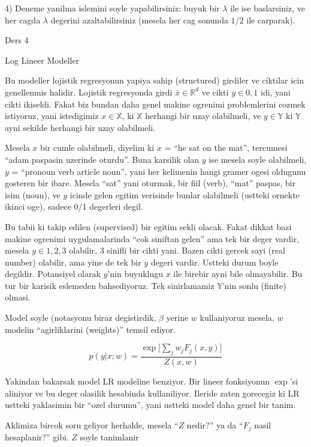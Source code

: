\documentclass[12pt,fleqn]{article}\usepackage{../common}
\begin{document}
4) Deneme yanilma islemini soyle yapabilirsiniz: buyuk bir $\lambda$ ile
ise baslarsiniz, ve her cagda $\lambda$ degerini azaltabilirsiniz (mesela
her cag sonunda $1/2$ ile carparak).

Ders 4

Log Lineer Modeller

Bu modeller lojistik regresyonun yapiya sahip (structured) girdiler ve
ciktilar icin genellenmis halidir. Lojistik regresyonda girdi $\bar{x} \in
\mathbb{R}^d$ ve 
cikti $y \in {0,1}$ idi, yani cikti ikiseldi. Fakat biz bundan daha genel makine
ogrenimi problemlerini cozmek istiyoruz, yani istedigimiz $x \in \mathbb{X}$, ki
$\mathbb{X}$ herhangi bir uzay olabilmeli, ve $y \in \mathbb{Y}$ ki $\mathbb{Y}$ ayni sekilde herhangi bir 
uzay olabilmeli. 

Mesela $x$ bir cumle olabilmeli, diyelim ki $x$ = ``he sat on the mat'',
tercumesi ``adam paspasin uzerinde oturdu''. Buna karsilik olan $y$ ise
mesela soyle olabilmeli, $y$ = ``pronoun verb article noun'', yani her
kelimenin hangi gramer ogesi oldugunu gosteren bir ibare. Mesela ``sat''
yani oturmak, bir fiil (verb), ``mat'' paspas, bir isim (noun), ve $y$
icinde gelen egitim verisinde bunlar olabilmeli (ustteki ornekte ikinci
oge), sadece 0/1 degerleri degil.

Bu tabii ki takip edilen (supervised) bir egitim sekli olacak. Fakat dikkat
bazi makine ogrenimi uygulamalarinda ``cok siniftan gelen'' ama tek bir
deger vardir, mesela $y \in {1,2,3}$ olabilir, 3 sinifli bir cikti
yani. Bazen cikti gercek sayi (real number) olabilir, ama yine de tek bir
$y$ degeri vardir. Ustteki durum boyle degildir. Potansiyel olarak $y$'nin
buyuklugu $x$ ile birebir ayni bile olmayabilir. Bu tur bir karisik
eslemeden bahsediyoruz.  Tek sinirlamamiz $\mathbb{Y}$'nin sonlu (finite)
olmasi.

Model soyle (notasyonu biraz degistirdik, $\beta$ yerine $w$ kullaniyoruz
mesela, $w$ modelin ``agirliklarini (weights)'' temsil ediyor. 

$$ p(y|x;w) = 
\frac{\exp \big[ \sum_{j} w_j F_j (x,y) \big]}{Z(x,w)}
$$

Yakindan bakarsak model LR modeline benziyor. Bir lineer fonksiyonun
$\exp$'si aliniyor ve bu deger olasilik hesabinda kullaniliyor. Ileride
zaten gorecegiz ki LR ustteki yaklasimin bir ``ozel durumu'', yani ustteki
model daha genel bir tanim. 

Aklimiza bircok soru geliyor herhalde, mesela ``$Z$ nedir?'' ya da ``$F_j$
nasil hesaplanir?'' gibi. $Z$ soyle tanimlanir
\end{document}
